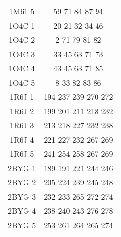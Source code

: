 \begin{table}[!htbp]
{\begin{tabular}{cc}
        1M61 5 & 59 71 84 87 94 \\
        1O4C 1 & 20 21 32 34 46 \\
        1O4C 2 & 2 71 79 81 82 \\
        1O4C 3 & 33 45 63 71 73 \\
        1O4C 4 & 43 45 63 71 85 \\
        1O4C 5 & 8 33 82 83 86 \\
        1R6J 1 & 194 237 239 270 272 \\
        1R6J 2 & 199 201 211 218 232 \\
        1R6J 3 & 213 218 227 232 238 \\
        1R6J 4 & 221 227 232 267 269 \\
        1R6J 5 & 241 254 258 267 269 \\
        2BYG 1 & 189 191 221 244 246 \\
        2BYG 2 & 205 224 239 245 248 \\
        2BYG 3 & 232 233 265 272 274 \\
        2BYG 4 & 238 240 243 276 278 \\
        2BYG 5 & 253 261 264 265 274 \\

        \bottomrule
      \end{tabular}      
}

\label{tab:test5}      
    \end{table}


